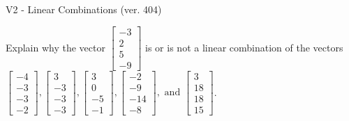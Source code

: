\begin{exercise}
  \begin{exerciseTitle}V2 - Linear Combinations (ver. 404)\end{exerciseTitle}
  \begin{exerciseStatement}
    Explain why the vector \(\left[\begin{array}{c}
-3 \\
2 \\
5 \\
-9
\end{array}\right]\)  is or is not a linear 
	combination of the vectors \(\left[\begin{array}{c}
-4 \\
-3 \\
-3 \\
-2
\end{array}\right] , \left[\begin{array}{c}
3 \\
-3 \\
-3 \\
-3
\end{array}\right] , \left[\begin{array}{c}
3 \\
0 \\
-5 \\
-1
\end{array}\right] , \left[\begin{array}{c}
-2 \\
-9 \\
-14 \\
-8
\end{array}\right] , \text{ and } \left[\begin{array}{c}
3 \\
18 \\
18 \\
15
\end{array}\right]\).
	



\end{exerciseStatement}
\end{exercise}
